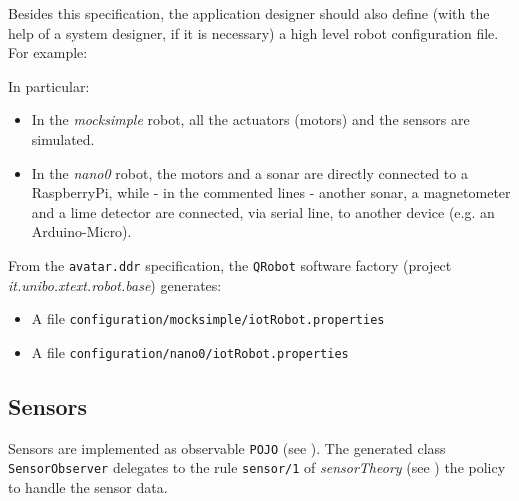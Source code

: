 Besides this specification, the application designer should also define (with the help of a system designer, if it is necessary) a high level robot configuration file. For example:



In particular:

\begin{itemize}
\item In the \textit{mocksimple} robot, all the actuators (motors) and the sensors are simulated.
\item In the \textit{nano0} robot, the motors and a sonar are directly connected to a RaspberryPi, while - in the commented lines - another sonar, a magnetometer and a lime detector are  connected, via serial line, to another device (e.g. an Arduino-Micro).
\end{itemize}

From the \texttt{avatar.ddr} specification, the \texttt{QRobot} software factory (project \textit{it.unibo.xtext.robot.base}) generates:
\begin{itemize}
\item A file \texttt{configuration/mocksimple/iotRobot.properties} 


\item A file \texttt{configuration/nano0/iotRobot.properties} 


\end{itemize}

 
\subsection{Sensors}

Sensors are implemented as observable \texttt{POJO} (see ). The generated class \texttt{SensorObserver} delegates to the rule \texttt{sensor/1} of \textit{sensorTheory} (see ) the policy to handle the sensor data.



